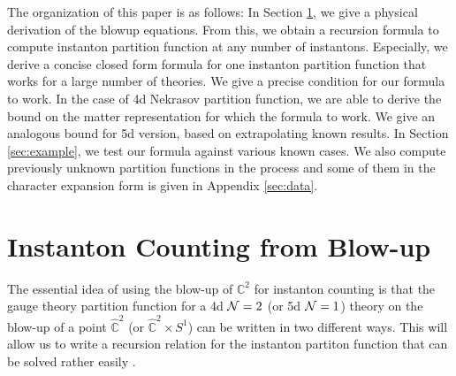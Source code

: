 \documentclass[letterpaper, 11pt]{article}
\def\IC{\mathbb{C}}
\def\CN{{\cal N}}
\begin{document}
The organization of this paper is as follows: In Section \ref{sec:blowup}, we give a physical derivation of the blowup equations. From this, we obtain a recursion formula to compute instanton partition function at any number of instantons. Especially, we derive a concise closed form formula for one instanton partition function that works for a large number of theories. We give a precise condition for our formula to work. In the case of 4d Nekrasov partition function, we are able to derive the bound on the matter representation for which the formula to work. We give an analogous bound for 5d version, based on extrapolating known results. In Section \ref{sec:example}, we test our formula against various known cases. We also compute previously unknown partition functions in the process and some of them in the character expansion form is given in Appendix \ref{sec:data}. 

%
%

\section{Instanton Counting from Blow-up} \label{sec:blowup}



The essential idea of using the blow-up of ${\IC}^2$ for instanton counting is that the gauge theory partition function for a 4d $\CN=2$ (or 5d $\CN=1$) theory on the blow-up of a point $\hat{\IC}^2$ (or $\hat{\IC}^2 \times S^1$) can be written in two different ways. This will allow us to write a recursion relation for the instanton partiton function that can be solved rather easily \cite{Nakajima:2003pg, Nakajima:2003uh,Nakajima:2005fg, Keller:2012da}. 
\end{document}
